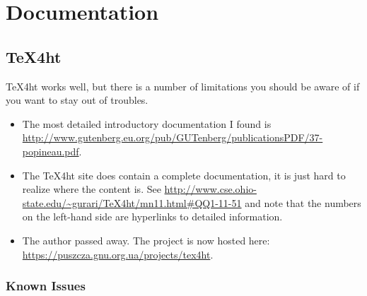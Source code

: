 \documentclass[openright,twoside,11pt]{book}
\begin{document}
\chapter{Documentation}

\section{TeX4ht}

TeX4ht works well, but there is a number of limitations you should be
aware of if you want to stay out of troubles.
\begin{itemize}
\item The most detailed introductory documentation I found is
  \url{http://www.gutenberg.eu.org/pub/GUTenberg/publicationsPDF/37-popineau.pdf}.
\item The TeX4ht site does contain a complete documentation, it is
  just hard to realize where the content is.  See
  \url{http://www.cse.ohio-state.edu/~gurari/TeX4ht/mn11.html#QQ1-11-51}
  and note that the numbers on the left-hand side are hyperlinks to
  detailed information.
\item The author passed away.  The project is now hosted here:
  \url{https://puszcza.gnu.org.ua/projects/tex4ht}.
\end{itemize}

\subsection{Known Issues}
\end{document}

